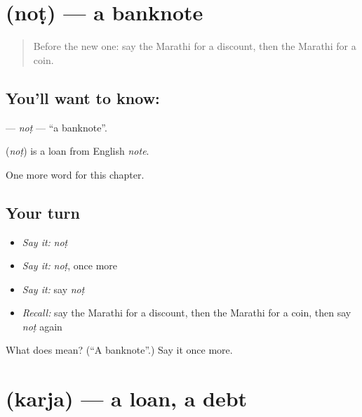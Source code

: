 \section[\texorpdfstring{\mr{नोट} (noṭ)}{नोट (noṭ)}]{ (noṭ) — a banknote}

\label{lesson:MR-C182-not}



\begin{quote}
Before the new one: say the Marathi for a discount, then the Marathi for a coin.
\end{quote}

\subsection*{You'll want to know: }
\textbf{} — \emph{noṭ} — \textquotedblleft{}a banknote\textquotedblright{}.

\begin{cousinweb}
\textbf{} (\emph{noṭ}) is a loan from English \emph{note}.
\end{cousinweb}

\begin{grammarlens}[title={What you've built}]
One more word for this chapter.
\end{grammarlens}

\subsection*{Your turn}
\begin{itemize}
\raggedright
  \item \emph{Say it:} \emph{noṭ}
  \item \emph{Say it:} \emph{noṭ}, once more
  \item \emph{Say it:} say \emph{noṭ}
  \item \emph{Recall:} say the Marathi for a discount, then the Marathi for a coin, then say \emph{noṭ} again
\end{itemize}

\begin{tcolorbox}[breakable,colback=teal!4,colframe=teal!35!black,title={Before you move on}]
What does  mean? (\textquotedblleft{}A banknote\textquotedblright{}.) Say it once more.
\end{tcolorbox}
\section[\texorpdfstring{\mr{कर्ज} (karja)}{कर्ज (karja)}]{ (karja) — a loan, a debt}

